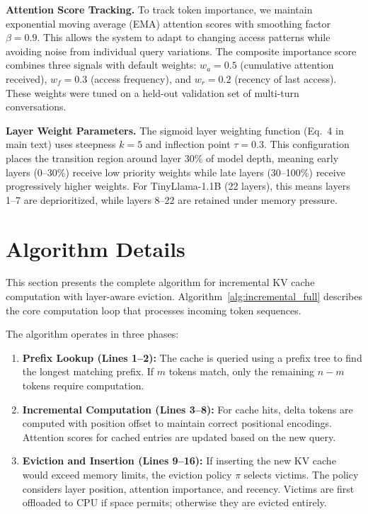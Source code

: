 \documentclass{article}
\begin{document}
\textbf{Attention Score Tracking.}
To track token importance, we maintain exponential moving average (EMA) attention scores with smoothing factor $\beta = 0.9$.
This allows the system to adapt to changing access patterns while avoiding noise from individual query variations.
The composite importance score combines three signals with default weights: $w_a = 0.5$ (cumulative attention received), $w_f = 0.3$ (access frequency), and $w_r = 0.2$ (recency of last access).
These weights were tuned on a held-out validation set of multi-turn conversations.

\textbf{Layer Weight Parameters.}
The sigmoid layer weighting function (Eq.~4 in main text) uses steepness $k = 5$ and inflection point $\tau = 0.3$.
This configuration places the transition region around layer 30\% of model depth, meaning early layers (0--30\%) receive low priority weights while late layers (30--100\%) receive progressively higher weights.
For TinyLlama-1.1B (22 layers), this means layers 1--7 are deprioritized, while layers 8--22 are retained under memory pressure.

\section{Algorithm Details}
\label{app:algorithm}

This section presents the complete algorithm for incremental KV cache computation with layer-aware eviction.
Algorithm~\ref{alg:incremental_full} describes the core computation loop that processes incoming token sequences.

The algorithm operates in three phases:
\begin{enumerate}
    \item \textbf{Prefix Lookup (Lines 1--2):} The cache is queried using a prefix tree to find the longest matching prefix. If $m$ tokens match, only the remaining $n-m$ tokens require computation.
    \item \textbf{Incremental Computation (Lines 3--8):} For cache hits, delta tokens are computed with position offset to maintain correct positional encodings. Attention scores for cached entries are updated based on the new query.
    \item \textbf{Eviction and Insertion (Lines 9--16):} If inserting the new KV cache would exceed memory limits, the eviction policy $\pi$ selects victims. The policy considers layer position, attention importance, and recency. Victims are first offloaded to CPU if space permits; otherwise they are evicted entirely.
\end{enumerate}
\end{document}
